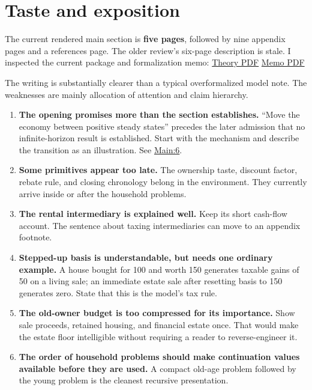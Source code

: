 \documentclass[11pt,letterpaper]{article}
\begin{document}
\endgroup

\section{Taste and exposition}\label{taste-and-exposition}

The current rendered main section is \textbf{five pages}, followed by nine appendix pages
and a references page. The older review's six-page description is stale. I inspected the
current package and formalization memo: \hyperlink{source-package-pdf}{Theory PDF}
\hyperlink{source-memo-pdf}{Memo PDF}

The writing is substantially clearer than a typical overformalized model note. The
weaknesses are mainly allocation of attention and claim hierarchy.

\begin{enumerate}
\def\labelenumi{\arabic{enumi}.}
\item
  \textbf{The opening promises more than the section establishes.} ``Move the economy
  between positive steady states'' precedes the later admission that no infinite-horizon
  result is established. Start with the mechanism and describe the transition as an
  illustration. See \hyperlink{source-main}{Main:6}.
\item
  \textbf{Some primitives appear too late.} The ownership taste, discount factor, rebate
  rule, and closing chronology belong in the environment. They currently arrive inside or
  after the household problems.
\item
  \textbf{The rental intermediary is explained well.} Keep its short cash-flow account.
  The sentence about taxing intermediaries can move to an appendix footnote.
\item
  \textbf{Stepped-up basis is understandable, but needs one ordinary example.} A house
  bought for 100 and worth 150 generates taxable gains of 50 on a living sale; an
  immediate estate sale after resetting basis to 150 generates zero. State that this is
  the model's tax rule.
\item
  \textbf{The old-owner budget is too compressed for its importance.} Show sale proceeds,
  retained housing, and financial estate once. That would make the estate floor
  intelligible without requiring a reader to reverse-engineer it.
\item
  \textbf{The order of household problems should make continuation values available before
  they are used.} A compact old-age problem followed by the young problem is the cleanest
  recursive presentation.

\end{enumerate}
\end{document}
